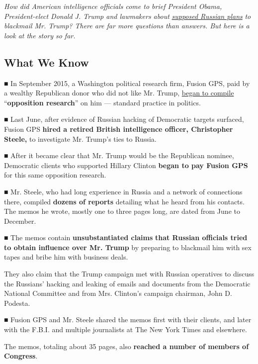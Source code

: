 \emph{How did American intelligence officials come to brief President
Obama, President-elect Donald J. Trump and lawmakers about}
\href{https://www.nytimes.com/2017/01/10/us/politics/donald-trump-russia-intelligence.html}{\emph{supposed
Russian plans}} \emph{to blackmail Mr. Trump? There are far more
questions than answers. But here is a look at the story so far.}

\hypertarget{what-we-know}{%
\subsection{What We Know}\label{what-we-know}}

■ In September 2015, a Washington political research firm, Fusion GPS,
paid by a wealthy Republican donor who did not like Mr. Trump,
\href{https://www.nytimes.com/2017/01/11/us/politics/donald-trump-russia-intelligence.html}{began
to compile} ``\textbf{opposition research}'' on him --- standard
practice in politics.

■ Last June, after evidence of Russian hacking of Democratic targets
surfaced, Fusion GPS \textbf{hired a retired British intelligence
officer, Christopher Steele,} to investigate Mr. Trump's ties to Russia.

■ After it became clear that Mr. Trump would be the Republican nominee,
Democratic clients who supported Hillary Clinton \textbf{began to pay
Fusion GPS} for this same opposition research.

■ Mr. Steele, who had long experience in Russia and a network of
connections there, compiled \textbf{dozens of reports} detailing what he
heard from his contacts. The memos he wrote, mostly one to three pages
long, are dated from June to December.

■ The memos contain \textbf{unsubstantiated claims} \textbf{that Russian
officials tried to obtain influence over Mr. Trump} by preparing to
blackmail him with sex tapes and bribe him with business deals.

They also claim that the Trump campaign met with Russian operatives to
discuss the Russians' hacking and leaking of emails and documents from
the Democratic National Committee and from Mrs. Clinton's campaign
chairman, John D. Podesta.

■ Fusion GPS and Mr. Steele shared the memos first with their clients,
and later with the F.B.I. and multiple journalists at The New York Times
and elsewhere.

The memos, totaling about 35 pages, also \textbf{reached a number of
members of Congress}.

